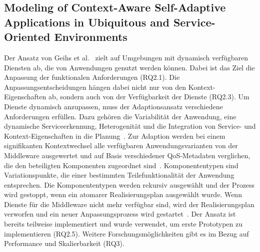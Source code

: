 \documentclass[conference,compsoc,ngerman]{IEEEtran}
\begin{document}
\subsection{Modeling of Context-Aware Self-Adaptive Applications in Ubiquitous and Service-Oriented Environments}
Der Ansatz von Geihs et al.~\cite{geihs2009modeling} zielt auf Umgebungen mit dynamisch verfügbaren Diensten ab, die von Anwendungen genutzt werden können. Dabei ist das Ziel die Anpassung der funktionalen Anforderungen (RQ2.1). Die Anpassungsentscheidungen hängen dabei nicht nur von den Kontext-Eigenschaften ab, sondern auch von der Verfügbarkeit der Dienste (RQ2.3). Um Dienste dynamisch anzupassen, muss der Adaptionsansatz verschiedene Anforderungen erfüllen. Dazu gehören die Variabilität der Anwendung, eine dynamische Serviceerkennung, Heterogenität und die Integration von Service- und Kontext-Eigenschaften in die Planung~\cite{geihs2009modeling}.
Zur Adaption werden bei einem signifikanten Kontextwechsel alle verfügbaren Anwendungsvarianten von der Middleware ausgewertet und auf Basis verschiedener QoS-Metadaten verglichen, die den beteiligten Komponenten zugeordnet sind~\cite{geihs2009modeling}. Komponententypen sind Variationspunkte, die einer bestimmten Teilefunktionalität der Anwendung entsprechen. Die Komponententypen werden rekursiv ausgewählt und der Prozess wird gestoppt, wenn ein atomarer Realisierungsplan ausgewählt wurde.
Wenn Dienste für die Middleware nicht mehr verfügbar sind, wird der Realisierungsplan verworfen und ein neuer Anpassungsprozess wird gestartet~\cite{geihs2009modeling}.
Der Ansatz ist bereits teilweise implementiert und wurde verwendet, um erste Prototypen zu implementieren (RQ2.5). Weitere Forschungsmöglichkeiten gibt es im Bezug auf Performance und Skalierbarkeit (RQ3).
\end{document}
